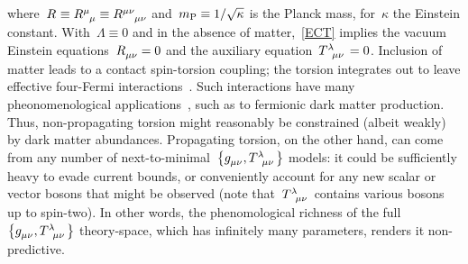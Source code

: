 \documentclass[aps,prd,reprint,preprintnumbers,showpacs,floatfix,nofootinbib,superscript address]{revtex4-2}
\begin{document}
where~$\MAGF{}\equiv\MAGF{^\mu_\mu}\equiv\MAGF{^{\mu\nu}_{\mu\nu}}$ and~${m_{\mathrm{P}}}{}\equiv 1/\sqrt{\kappa}$ is the Planck mass, for~$\kappa$ the Einstein constant. With~$\Lambda\equiv 0$ and in the absence of matter,~\cref{ECT} implies the vacuum Einstein equations~$\MAGF{_{\mu\nu}}= 0$ and the auxiliary equation~$\MAGT{^\lambda_{\mu\nu}}= 0$. Inclusion of matter leads to a contact spin-torsion coupling; the torsion integrates out to leave effective four-Fermi interactions~\cite{Kibble:1961ba, Rodichev:1961,Freidel:2005sn,Alexandrov:2008iy,Shaposhnikov:2020frq,Karananas:2021zkl,Rigouzzo:2023sbb}. Such interactions have many pheonomenological applications~\cite{Freidel:2005sn,Bauer:2008zj,Poplawski:2011xf,Diakonov:2011fs,Khriplovich:2012xg,Magueijo:2012ug,Khriplovich:2013tqa,Markkanen:2017tun,Carrilho:2018ffi,Enckell:2018hmo,Rasanen:2018fom,BeltranJimenez:2019hrm,Rubio:2019ypq,Shaposhnikov:2020geh,Karananas:2020qkp,Langvik:2020nrs,Shaposhnikov:2020gts,Mikura:2020qhc,Shaposhnikov:2020aen,Kubota:2020ehu,Enckell:2020lvn,Iosifidis:2021iuw,Bombacigno:2021bpk,Racioppi:2021ynx,Cheong:2021kyc,Dioguardi:2021fmr,Piani:2022gon,Dux:2022kuk,Rigouzzo:2022yan,Pradisi:2022nmh,Salvio:2022suk,Rasanen:2022ijc,Gialamas:2022xtt,Gialamas:2023emn,Gialamas:2023flv,Piani:2023aof,Poisson:2023tja,Rigouzzo:2023sbb,Barker:2023fem,Karananas:2023zgg,Martini:2023apm,He:2024wqv}, such as to fermionic dark matter production. Thus, non-propagating torsion might reasonably be constrained (albeit weakly) by dark matter abundances. Propagating torsion, on the other hand, can come from any number of next-to-minimal~$\big\{\FieldG{_{\mu\nu}},\MAGT{^\lambda_{\mu\nu}}\big\}$ models: it could be sufficiently heavy to evade current bounds, or conveniently account for any new scalar or vector bosons that might be observed (note that~$\MAGT{^\lambda_{\mu\nu}}$ contains various bosons up to spin-two). In other words, the phenomological richness of the full~$\big\{\FieldG{_{\mu\nu}},\MAGT{^\lambda_{\mu\nu}}\big\}$ theory-space, which has infinitely many parameters, renders it non-predictive.
\end{document}
